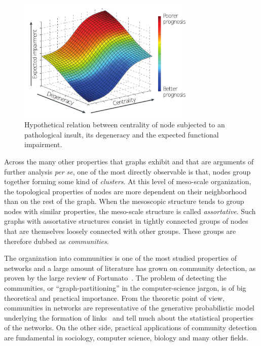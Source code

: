 \begin{figure}[htb!]
\centering
\includegraphics[width=0.75\textwidth]{images/prognosis.pdf}
\caption{Hypothetical relation between centrality of node subjected to an pathological insult, its degeneracy and the expected functional impairment.}
\label{fig:prognosis_centrality}
\end{figure}

Across the many other properties that graphs exhibit and that are arguments of further analysis \emph{per se}, one of the most directly observable is that, nodes group together forming some kind of \emph{clusters}.
At this level of meso-scale organization, the topological properties of nodes are more dependent on their neighborhood than on the rest of the graph. When the mesoscopic structure tends to group nodes with similar properties, the meso-scale structure is called \emph{assortative}. Such graphs with assortative structures consist in tightly connected groups of nodes that are themselves loosely connected with other groups. These groups are therefore dubbed as \emph{communities}. 

The organization into communities is one of the most studied properties of networks and a large amount of literature has grown on community detection, as proven by the large review of Fortunato~\cite{fortunato2010}.
The problem of detecting the communities, or ``graph-partitioning'' in the computer-science jargon, is of big theoretical and practical importance.
From the theoretic point of view, communities in networks are representative of the generative probabilistic model underlying the formation of links~\cite{karrer2011} and tell much about the statistical properties of the networks.
On the other side, practical applications of community detection are fundamental in sociology, computer science, biology and many other fields.

